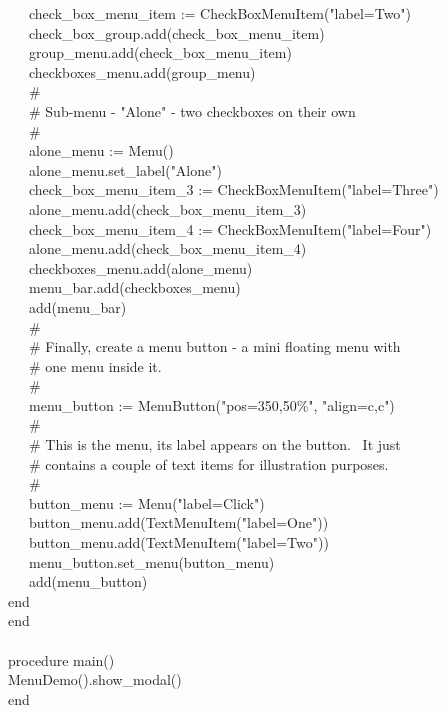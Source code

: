 {\>   \ \ \ check\_box\_menu\_item :=
CheckBoxMenuItem("label=Two") \\
\>   \ \ \ check\_box\_group.add(check\_box\_menu\_item) \\
\>   \ \ \ group\_menu.add(check\_box\_menu\_item) \\
\>   \ \ \ checkboxes\_menu.add(group\_menu) \\
\>   \ \ \ \# \\
\>   \ \ \ \# Sub-menu - "Alone" - two
checkboxes on their own \\
\>   \ \ \ \# \\
\>   \ \ \ alone\_menu := Menu() \\
\>   \ \ \ alone\_menu.set\_label("Alone") \\
\>   \ \ \ check\_box\_menu\_item\_3 :=
CheckBoxMenuItem("label=Three") \\
\>   \ \ \ alone\_menu.add(check\_box\_menu\_item\_3) \\
\>   \ \ \ check\_box\_menu\_item\_4 :=
CheckBoxMenuItem("label=Four") \\
\>   \ \ \ alone\_menu.add(check\_box\_menu\_item\_4) \\
\>   \ \ \ checkboxes\_menu.add(alone\_menu) \\
\>   \ \ \ menu\_bar.add(checkboxes\_menu) \\
\>   \ \ \ add(menu\_bar) \\
\>   \ \ \ \# \\
\>   \ \ \ \# Finally, create a menu button - a mini floating menu with \\
\>   \ \ \ \# one menu inside it. \\
\>   \ \ \ \# \\
\>   \ \ \ menu\_button :=
MenuButton("pos=350,50\%",
"align=c,c") \\
\>   \ \ \ \# \\
\>   \ \ \ \# This is the menu, its label appears on the button. \ It just\\
\>   \ \ \ \# contains a couple of text items for illustration purposes. \\
\>   \ \ \ \# \\
\>   \ \ \ button\_menu :=
Menu("label=Click") \\
\>   \ \ \ button\_menu.add(TextMenuItem("label=One")) \\
\>   \ \ \ button\_menu.add(TextMenuItem("label=Two")) \\
\>   \ \ \ menu\_button.set\_menu(button\_menu) \\
\>   \ \ \ add(menu\_button) \\
\>   end \\
end \\
\ \\
procedure main() \\
\>   MenuDemo().show\_modal() \\
end
}

